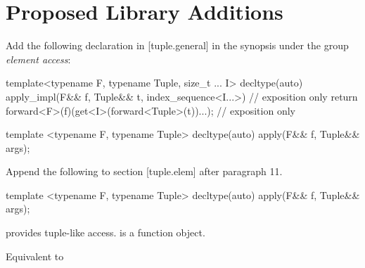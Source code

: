 \documentclass[ebook,11pt,article]{memoir}
\begin{document}
\chapter{Proposed Library Additions}

Add the following declaration in [tuple.general] in the synopsis under the group \emph{element access}:

\begin{codeblock}
template<typename F, typename Tuple, size_t ... I>
decltype(auto) apply_impl(F&& f, Tuple&& t, index_sequence<I...>) // exposition only
{
	return forward<F>(f)(get<I>(forward<Tuple>(t))...); // exposition only
}

template <typename F, typename Tuple>
decltype(auto) apply(F&& f, Tuple&& args);
\end{codeblock}

Append the following to section [tuple.elem] after paragraph 11.

\begin{itemdecl}
template <typename F, typename Tuple>
decltype(auto) apply(F&& f, Tuple&& args);
\end{itemdecl}
\begin{itemdescr}
\pnum
\requires {} provides tuple-like access.  is a function object.

\effects Equivalent to 
\end{itemdescr}






\end{document}
